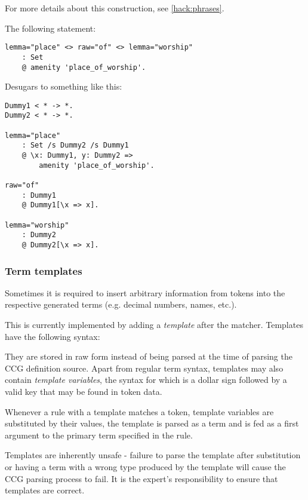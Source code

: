 \documentclass[main.tex]{subfiles}
\begin{document}
For more details about this construction, see \cref{hack:phrases}.

\begin{exampleenv}
The following statement:
\begin{lstlisting}
lemma="place" <> raw="of" <> lemma="worship"
    : Set
    @ amenity 'place_of_worship'.
\end{lstlisting}

Desugars to something like this:
\begin{lstlisting}
Dummy1 < * -> *.
Dummy2 < * -> *.

lemma="place"
    : Set /s Dummy2 /s Dummy1
    @ \x: Dummy1, y: Dummy2 =>
        amenity 'place_of_worship'.

raw="of"
    : Dummy1
    @ Dummy1[\x => x].

lemma="worship"
    : Dummy2
    @ Dummy2[\x => x].
\end{lstlisting}
\end{exampleenv}

\subsubsection{Term templates}
Sometimes it is required to insert arbitrary information from tokens into
the respective generated terms (e.g. decimal numbers, names, etc.).

This is currently implemented by adding a \emph{template} after the
matcher. Templates have the following syntax:
\begin{center}
\end{center}

They are stored in raw form instead of being
parsed at the time of parsing the
CCG definition source. Apart from regular term syntax, templates may also
contain \emph{template variables}, the syntax for which is a dollar sign
followed by a valid key that may be found in token data.

Whenever a rule with a template matches a token, template variables are
substituted by their values, the template is parsed as a term and is fed
as a first argument to the primary term specified in the rule.

Templates are inherently unsafe - failure to parse the template after substitution
or having a term with a wrong type produced by the template will cause the
CCG parsing process to fail. It is the expert's responsibility to ensure that
templates are correct.
\end{document}
